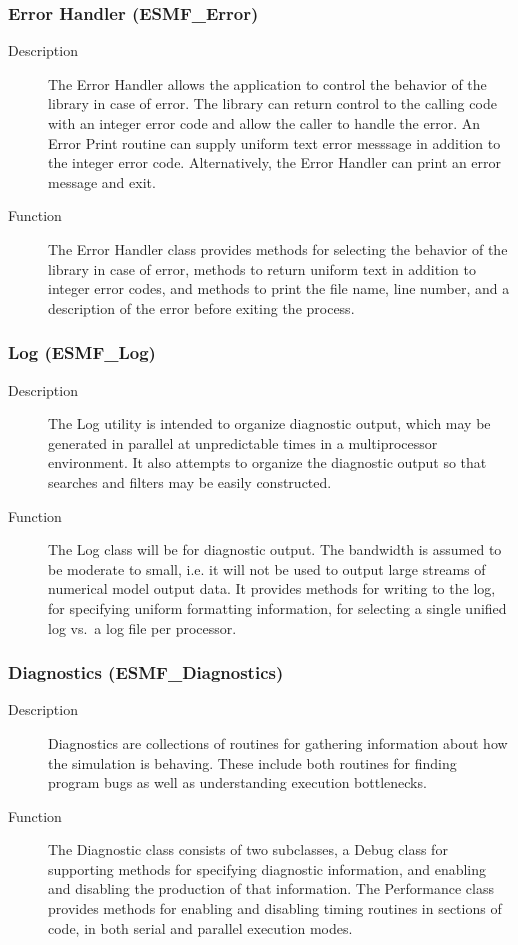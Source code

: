 \subsubsection{Error Handler (ESMF\_Error)}
\label{sec:error} 
\begin{description}
\item [Description] The Error Handler allows the application to control 
the behavior of the library in case of error.  The library can return
control to the calling code with an integer error code and allow the
caller to handle the error.  An Error Print routine can
supply uniform text error messsage in addition to the integer error code.
Alternatively, the Error Handler can print an error message and exit.
\item [Function] The Error Handler class provides methods for selecting
the behavior of the library in case of error, methods to return uniform
text in addition to integer error codes, and methods to print the file
name, line number, and a description of the error before exiting the process.
\end{description}

\subsubsection{Log (ESMF\_Log)}
\label{sec:log} 
\begin{description}
\item [Description] The Log utility is intended to organize diagnostic
output, which may be generated in parallel at unpredictable times in
a multiprocessor environment.  It also attempts to organize
the diagnostic output so that searches and filters may be easily constructed. 
\item [Function] The Log class will be for diagnostic output. 
The bandwidth is assumed to be moderate to small, i.e. it will not be used 
to output large streams of numerical model output data.  
It provides methods for writing to the log, for specifying uniform
formatting information, for selecting a single unified log vs.\  a log 
file per processor.
\end{description}

\subsubsection{Diagnostics (ESMF\_Diagnostics)}
\label{sec:diagnostics} 
\begin{description}
\item [Description] Diagnostics are collections of routines for
gathering information about how the simulation is behaving.  
These include both routines for finding program bugs
as well as understanding execution bottlenecks.
\item [Function] The Diagnostic class consists of two subclasses,
a Debug class for supporting methods for specifying
diagnostic information, and enabling and disabling the production of
that information.  The Performance class provides methods
for enabling and disabling timing routines in sections of
code, in both serial and parallel execution modes.
\end{description}




